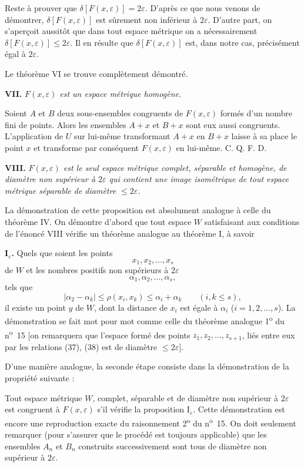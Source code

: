 \documentclass[a4paper,12pt]{amsart}
\newcommand{\srcpage}[1]{} %
\begin{document}
Reste à prouver que $\delta[F(x,\varepsilon)]=2\varepsilon$. D'après ce que nous venons de démontrer, $\delta[F(x,\varepsilon)]$ est sûrement non inférieur à $2\varepsilon$. D'autre part, on s'aperçoit aussitôt que dans tout espace métrique on a nécessairement $\delta[F(x,\varepsilon)]\le2\varepsilon$. Il en résulte que $\delta[F(x,\varepsilon)]$ est, dans notre cas, précisément égal à $2\varepsilon$.
\srcpage{84}
Le théorème VI se trouve complètement démontré.

\textbf{VII.} \textit{$F(x,\varepsilon)$ est un espace métrique homogène.}

Soient $A$ et $B$ deux sous-ensembles congruents de $F(x,\varepsilon)$ formés d'un nombre fini de points. Alors les ensembles $A+x$ et $B+x$ sont eux aussi congruents. L'application de $U$ sur lui-même transformant $A+x$ en $B+x$ laisse à sa place le point $x$ et transforme par conséquent $F(x,\varepsilon)$ en lui-même. \hfill C. Q. F. D.

\textbf{VIII.} \textit{$F(x,\varepsilon)$ est le seul espace métrique complet, séparable et homogène, de diamètre non supérieur à $2\varepsilon$ qui contient une image isométrique de tout espace métrique séparable de diamètre $\le2\varepsilon$.}

La démonstration de cette proposition est absolument analogue à celle du théorème IV. On démontre d'abord que tout espace $W$ satisfaisant aux conditions de l'énoncé VIII vérifie un théorème analogue au théorème I, à savoir

\textbf{I$_\varepsilon$.} Quels que soient les points
\[x_1,x_2,\ldots,x_s\]
de $W$ et les nombres positifs non supérieurs à $2\varepsilon$
\[\alpha_1,\alpha_2,\ldots,\alpha_s,\]
tels que
\[|\alpha_2-\alpha_k|\le\rho(x_i,x_k)\le\alpha_i+\alpha_k\qquad(i,k\le s),\]
il existe un point $y$ de $W$, dont la distance de $x_i$ est égale à $\alpha_i$ ($i=1,2,\ldots,s$). La démonstration se fait mot pour mot comme celle du théorème analogue 1\textsuperscript{o} du n\textsuperscript{o}~15 [on remarquera que l'espace formé des points $z_1,z_2,\ldots,z_{s+1}$, liés entre eux par les relations (37), (38) est de diamètre $\le2\varepsilon$].

D'une manière analogue, la seconde étape consiste dans la démonstration de la propriété suivante :

Tout espace métrique $W$, complet, séparable et de diamètre non supérieur à $2\varepsilon$ est congruent à $F(x,\varepsilon)$ s'il vérifie la proposition I$_\varepsilon$. Cette démonstration est encore une reproduction exacte du raisonnement 2\textsuperscript{o} du n\textsuperscript{o}~15. On doit seulement remarquer (pour s'assurer que le procédé est toujours applicable) que les ensembles $A_n$ et $B_n$ construits successivement sont tous de diamètre non supérieur à $2\varepsilon$.
\end{document}
